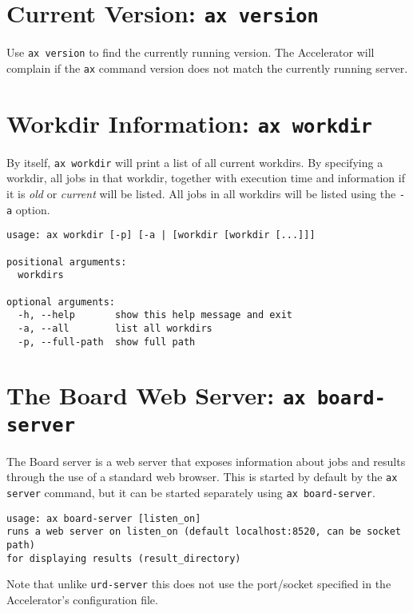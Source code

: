 \section{Current Version: \texttt{ax version}}
Use \texttt{ax version} to find the currently running version.  The
Accelerator will complain if the \texttt{ax} command version does not
match the currently running server.


\section{Workdir Information: \texttt{ax workdir}}
By itself, \texttt{ax workdir} will print a list of all current
workdirs.  By specifying a workdir, all jobs in that workdir, together
with execution time and information if it is \textsl{old} or
\textsl{current} will be listed.  All jobs in all workdirs will be
listed using the \texttt{-a} option.
\begin{snugshade}
\begin{verbatim}
usage: ax workdir [-p] [-a | [workdir [workdir [...]]]

positional arguments:
  workdirs

optional arguments:
  -h, --help       show this help message and exit
  -a, --all        list all workdirs
  -p, --full-path  show full path
\end{verbatim}
\end{snugshade}


\section{The Board Web Server: \texttt{ax board-server}}
The Board server is a web server that exposes information about jobs
and results through the use of a standard web browser.  This is
started by default by the \texttt{ax server} command, but it can be
started separately using \texttt{ax board-server}.
\begin{snugshade}
\begin{verbatim}
usage: ax board-server [listen_on]
runs a web server on listen_on (default localhost:8520, can be socket path)
for displaying results (result_directory)
\end{verbatim}
\end{snugshade}
Note that unlike \texttt{urd-server} this does not use the port/socket
specified in the Accelerator's configuration file.


